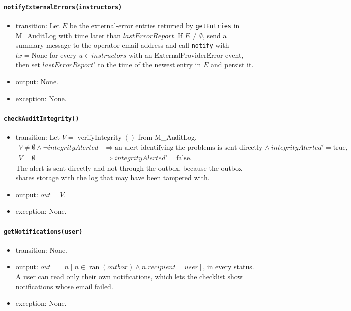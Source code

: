 \documentclass[12pt, titlepage]{article}
\begin{document}
\paragraph{\texttt{notifyExternalErrors(instructors)}}
\begin{itemize}
    \item transition: Let $E$ be the external-error entries returned by \texttt{getEntries}
    in M\_AuditLog with time later than $\mathit{lastErrorReport}$. If $E\ne\emptyset$,
    send a summary message to the operator email address and call \texttt{notify} with $tx=\text{None}$ for every $u\in instructors$ with an
    ExternalProviderError event, then set $\mathit{lastErrorReport}'$ to the time of the newest entry in $E$ and persist it.
    \item output: None.
    \item exception: None.
\end{itemize}

\paragraph{\texttt{checkAuditIntegrity()}}
\begin{itemize}
    \item transition: Let $V=\operatorname{verifyIntegrity}()$ from M\_AuditLog.
    \[
        \begin{aligned}
            V\ne\emptyset\land\neg\mathit{integrityAlerted}&\Rightarrow \text{an alert identifying the problems is sent directly to the operator email address}\land\mathit{integrityAlerted}'=\text{true},\\
            V=\emptyset&\Rightarrow\mathit{integrityAlerted}'=\text{false}.
        \end{aligned}
    \]
    The alert is sent directly and not through the outbox, because the outbox shares storage with the log
    that may have been tampered with.
    \item output: $out=V$.
    \item exception: None.
\end{itemize}

\paragraph{\texttt{getNotifications(user)}}
\begin{itemize}
    \item transition: None.
    \item output: $out=[n\mid n\in\operatorname{ran}(\mathit{outbox})\land n.recipient=user]$, in every status.
    A user can read only their own notifications, which lets the checklist show notifications whose email failed.
    \item exception: None.
\end{itemize}
\end{document}
